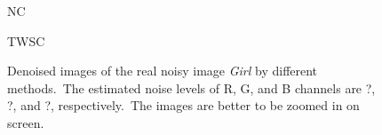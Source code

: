 \begin{figure}
{\begin{minipage}[t]{0.24\textwidth}
{\footnotesize NC}
\end{minipage}
\begin{minipage}[t]{0.24\textwidth}
\centering
{}
{\footnotesize TWSC}
\end{minipage}
}
    \caption{Denoised images of the real noisy image \textsl{Girl} \cite{ncwebsite} by different methods.\ The estimated noise levels of R, G, and B channels are ?, ?, and ?, respectively.\ The images are better to be zoomed in on screen.}
    \label{fig5-10}
\end{figure}


